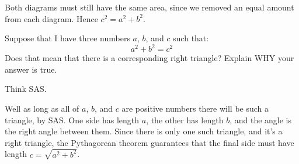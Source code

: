 \documentclass[noauthor,nooutcomes,handout,12pt]{ximera}
\begin{document}
\begin{question}
\begin{freeResponse}
\begin{center}
    \end{center}
    Both diagrams must still have the same area, since we removed an
    equal amount from each diagram.  Hence $c^2=a^2+b^2$.
  \end{freeResponse}
\end{question}
\mynewpage

\begin{question}
  Suppose that I have three numbers $a$, $b$, and $c$ such that:
  \[
  a^2 + b^2 = c^2
  \]
  Does that mean that there is a corresponding right triangle? Explain
  WHY your answer is true.
  \begin{hint}
    Think SAS. 
  \end{hint}
  \begin{freeResponse}
    Well as long as all of $a$, $b$, and $c$ are positive numbers there
    will be such a triangle, by SAS.  One side has length $a$, the
    other has length $b$, and the angle is the right angle between
    them. Since there is only one such triangle, and it's a right
    triangle, the Pythagorean theorem guarantees that the final side
    must have length $c = \sqrt{a^2+b^2}$.
  \end{freeResponse}
  
\end{question}
\end{document}
